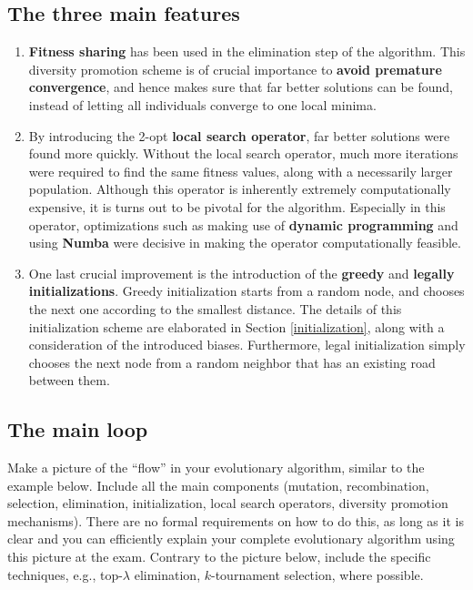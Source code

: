 \documentclass[a4paper,10pt]{article}
\newcommand{\ReplaceMe}[1]{{\color{blue}#1}}
\begin{document}
\subsection{The three main features}
\begin{enumerate}
\item \textbf{Fitness sharing} has been used in the elimination step of the algorithm. This diversity promotion scheme is of crucial importance to \textbf{avoid premature convergence}, and hence makes sure that far better solutions can be found, instead of letting all individuals converge to one local minima.
\item By introducing the 2-opt \textbf{local search operator}, far better solutions were found more quickly. Without the local search operator, much more iterations were required to find the same fitness values, along with a necessarily larger population. Although this operator is inherently extremely computationally expensive, it is turns out to be pivotal for the algorithm. Especially in this operator, optimizations such as making use of \textbf{dynamic programming} and using \textbf{Numba} were decisive in making the operator computationally feasible.
\item One last crucial improvement is the introduction of the \textbf{greedy} and \textbf{legally initializations}. Greedy initialization starts from a random node, and chooses the next one according to the smallest distance. The details of this initialization scheme are elaborated in Section \ref{initialization}, along with a consideration of the introduced biases. Furthermore, legal initialization simply chooses the next node from a random neighbor that has an existing road between them.
\end{enumerate}

\subsection{The main loop}

\ReplaceMe{Make a picture of the ``flow'' in your evolutionary algorithm, similar to the example below. Include all the main components (mutation, recombination, selection, elimination, initialization, local search operators, diversity promotion mechanisms). There are no formal requirements on how to do this, as long as it is clear and you can efficiently explain your complete evolutionary algorithm using this picture at the exam. Contrary to the picture below, include the specific techniques, e.g., top-$\lambda$ elimination, $k$-tournament selection, where possible.}
\end{document}
